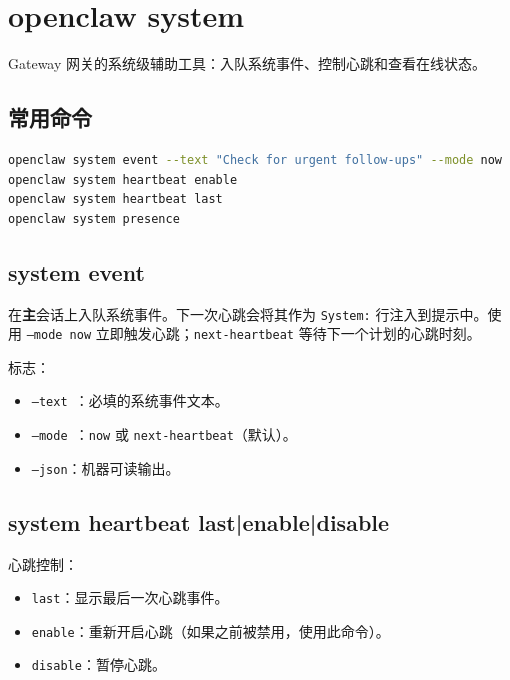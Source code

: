 \clearpage

\section{openclaw system}


Gateway 网关的系统级辅助工具：入队系统事件、控制心跳和查看在线状态。

\subsection{常用命令}


\begin{lstlisting}[language=bash]
openclaw system event --text "Check for urgent follow-ups" --mode now
openclaw system heartbeat enable
openclaw system heartbeat last
openclaw system presence
\end{lstlisting}


\subsection{system event}


在\textbf{主}会话上入队系统事件。下一次心跳会将其作为 \texttt{System:} 行注入到提示中。使用 \texttt{--mode now} 立即触发心跳；\texttt{next-heartbeat} 等待下一个计划的心跳时刻。

标志：

\begin{itemize}
  \item \texttt{--text }：必填的系统事件文本。
  \item \texttt{--mode }：\texttt{now} 或 \texttt{next-heartbeat}（默认）。
  \item \texttt{--json}：机器可读输出。
\end{itemize}


\subsection{system heartbeat last|enable|disable}


心跳控制：

\begin{itemize}
  \item \texttt{last}：显示最后一次心跳事件。
  \item \texttt{enable}：重新开启心跳（如果之前被禁用，使用此命令）。
  \item \texttt{disable}：暂停心跳。
\end{itemize}


